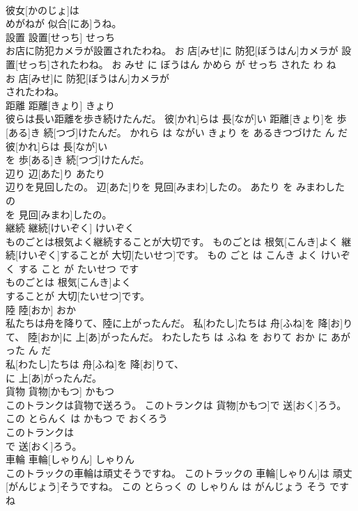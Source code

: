 \documentclass[8pt]{extreport}
\begin{document}
\begin{CJK}{UTF8}{min}
\\	彼女[かのじょ]は
\\	めがねが 似合[にあ]うね。			
\\	設置	設置[せっち]	せっち	
\\	お店に防犯カメラが設置されたわね。	お 店[みせ]に 防犯[ぼうはん]カメラが 設置[せっち]されたわね。	お みせ に ぼうはん かめら が せっち された わ ね	
\\	お 店[みせ]に 防犯[ぼうはん]カメラが
\\	されたわね。			
\\	距離	距離[きょり]	きょり	
\\	彼らは長い距離を歩き続けたんだ。	彼[かれ]らは 長[なが]い 距離[きょり]を 歩[ある]き 続[つづ]けたんだ。	かれら は ながい きょり を あるきつづけた ん だ	
\\	彼[かれ]らは 長[なが]い
\\	を 歩[ある]き 続[つづ]けたんだ。			
\\	辺り	辺[あた]り	あたり	
\\	辺りを見回したの。	辺[あた]りを 見回[みまわ]したの。	あたり を みまわした の	
\\	を 見回[みまわ]したの。			
\\	継続	継続[けいぞく]	けいぞく	
\\	ものごとは根気よく継続することが大切です。	ものごとは 根気[こんき]よく 継続[けいぞく]することが 大切[たいせつ]です。	もの ごと は こんき よく けいぞく する こと が たいせつ です	
\\	ものごとは 根気[こんき]よく
\\	することが 大切[たいせつ]です。			
\\	陸	陸[おか]	おか	
\\	私たちは舟を降りて、陸に上がったんだ。	私[わたし]たちは 舟[ふね]を 降[お]りて、 陸[おか]に 上[あ]がったんだ。	わたしたち は ふね を おりて おか に あがった ん だ	
\\	私[わたし]たちは 舟[ふね]を 降[お]りて、
\\	に 上[あ]がったんだ。			
\\	貨物	貨物[かもつ]	かもつ	
\\	このトランクは貨物で送ろう。	このトランクは 貨物[かもつ]で 送[おく]ろう。	この とらんく は かもつ で おくろう	
\\	このトランクは
\\	で 送[おく]ろう。			
\\	車輪	車輪[しゃりん]	しゃりん	
\\	このトラックの車輪は頑丈そうですね。	このトラックの 車輪[しゃりん]は 頑丈[がんじょう]そうですね。	この とらっく の しゃりん は がんじょう そう です ね	

\end{CJK}
\end{document}
